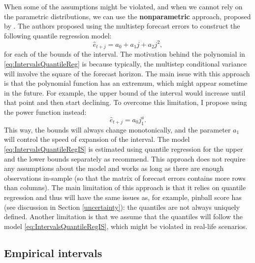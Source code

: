 \documentclass[
]{book}
\theoremstyle{definition}
\theoremstyle{definition}
\theoremstyle{definition}
\theoremstyle{definition}
\theoremstyle{remark}
\begin{document}
When some of the assumptions might be violated, and when we cannot rely on the parametric distributions, we can use the \textbf{nonparametric} approach, proposed by \citet{Taylor1999}. The authors proposed using the multistep forecast errors to construct the following quantile regression model:
\begin{equation}
    \hat{e}_{t+j} = a_0 + a_1 j + a_2 j^2,
    \label{eq:IntervalsQuantileReg}
\end{equation}
for each of the bounds of the interval. The motivation behind the polynomial in \eqref{eq:IntervalsQuantileReg} is because typically, the multistep conditional variance will involve the square of the forecast horizon. The main issue with this approach is that the polynomial function has an extremum, which might appear sometime in the future. For example, the upper bound of the interval would increase until that point and then start declining. To overcome this limitation, I propose using the power function instead:
\begin{equation}
    \hat{e}_{t+j} = a_0 j^a_1 .
    \label{eq:IntervalsQuantileRegIS}
\end{equation}
This way, the bounds will always change monotonically, and the parameter \(a_1\) will control the speed of expansion of the interval. The model \eqref{eq:IntervalsQuantileRegIS} is estimated using quantile regression for the upper and the lower bounds separately as \citet{Taylor1999} recommend. This approach does not require any assumptions about the model and works as long as there are enough observations in-sample (so that the matrix of forecast errors contains more rows than columns). The main limitation of this approach is that it relies on quantile regression and thus will have the same issues as, for example, pinball score has (see discussion in Section \ref{uncertainty}): the quantiles are not always uniquely defined. Another limitation is that we assume that the quantiles will follow the model \eqref{eq:IntervalsQuantileRegIS}, which might be violated in real-life scenarios.

\hypertarget{ADAMForecastingPIEmpirical}{%
\subsection{Empirical intervals}\label{ADAMForecastingPIEmpirical}}
\end{document}
